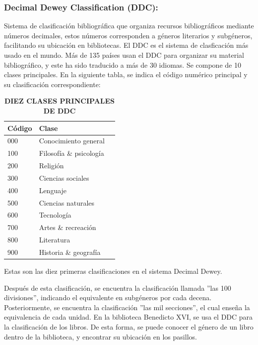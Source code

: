 \documentclass[spanish]{ieee_upb}
\begin{document}
\subsubsection{Decimal Dewey Classification (DDC):} Sistema de clasificación bibliográfica que organiza recursos bibliográficos mediante números decimales, estos números corresponden a géneros literarios y subgéneros, facilitando su ubicación en bibliotecas. El DDC es el sistema de clasficación más usado en el mundo. Más de 135 países usan el DDC para organizar su material bibliográfico, y este ha sido traducido a más de 30 idiomas\cite{oclc_dewey}. Se compone de 10 clases principales. En la siguiente tabla, se indica el código numérico principal y su clasificación correspondiente:


\begin{table}[htpb]
    \centering
    \caption[Decimal Dewey Classification (DDC)]{\bfseries DIEZ CLASES PRINCIPALES DE DDC}
    \label{tab:clasificacion_decimal}
    \begin{tabular}{lll} \hline
     
        \textbf{Código} & \textbf{Clase} \\ \hline
        000 & Conocimiento general \\ 
        100 & Filosofía \& psicología\hspace{7.5cm} \\ 
        200 & Religión \\ 
        300 & Ciencias sociales \\ 
        400 & Lenguaje \\ 
        500 & Ciencias naturales \\
        600 & Tecnología \\ 
        700 & Artes \& recreación \\ 
        800 & Literatura \\ 
        900 & Historia \& geografía \\ \hline
    \end{tabular}
    \vspace{2mm}
    \newline
    \small{Estas son las diez primeras clasificaciones en el sistema Decimal Dewey.}
\end{table}




Después de esta clasificación, se encuentra la clasificación llamada ''las 100 divisiones'', indicando el equivalente en subgéneros por cada decena. Posteriormente, se encuentra la clasificación ''las mil secciones'', el cual enseña la equivalencia de cada unidad. En la biblioteca Benedicto XVI, se usa el DDC para la clasificación de los libros. De esta forma, se puede conocer el género de un libro dentro de la biblioteca, y encontrar su ubicación en los pasillos. 
\end{document}
